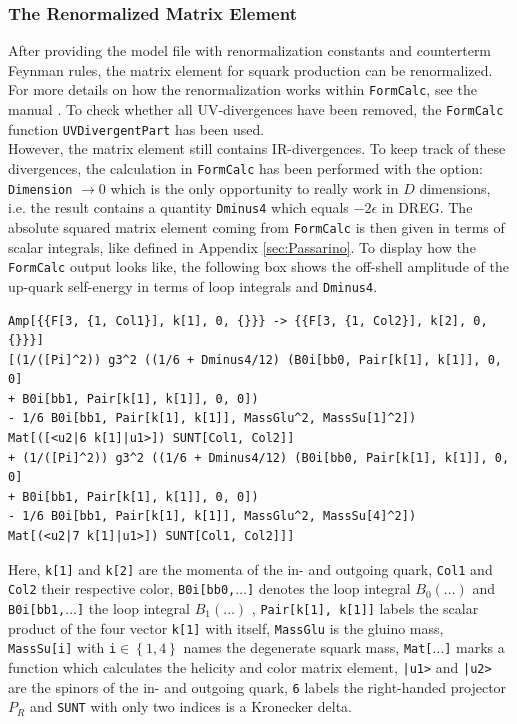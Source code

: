 \subsubsection{The Renormalized Matrix Element}
After providing the model file with renormalization constants and counterterm Feynman rules, the matrix element for squark production can be renormalized. For more details on how the renormalization works within \texttt{FormCalc}, see the manual \cite{FormCalcManual}.
To check whether all UV-divergences have been removed, the \texttt{FormCalc} function \texttt{UVDivergentPart} has been used.\\
However, the matrix element still contains IR-divergences. To keep track of these divergences, the calculation in \texttt{FormCalc} has been performed with the option: \texttt{Dimension} $\to 0$ which is the only opportunity to really work in $D$ dimensions, i.e. the result contains a quantity \texttt{Dminus4} which equals $-2\epsilon$ in DREG. The absolute squared matrix element coming from \texttt{FormCalc} is then given in terms of scalar integrals, like defined in Appendix \ref{sec:Passarino}. To display how the \texttt{FormCalc} output looks like, the following box shows the off-shell amplitude of the up-quark self-energy in terms of loop integrals and \texttt{Dminus4}.
\begin{lstlisting}[style=MyMathematicaOutput]
Amp[{{F[3, {1, Col1}], k[1], 0, {}}} -> {{F[3, {1, Col2}], k[2], 0, {}}}]
[(1/([Pi]^2)) g3^2 ((1/6 + Dminus4/12) (B0i[bb0, Pair[k[1], k[1]], 0, 0] 
+ B0i[bb1, Pair[k[1], k[1]], 0, 0]) 
- 1/6 B0i[bb1, Pair[k[1], k[1]], MassGlu^2, MassSu[1]^2]) 
Mat[([<u2|6 k[1]|u1>]) SUNT[Col1, Col2]] 
+ (1/([Pi]^2)) g3^2 ((1/6 + Dminus4/12) (B0i[bb0, Pair[k[1], k[1]], 0, 0] 
+ B0i[bb1, Pair[k[1], k[1]], 0, 0]) 
- 1/6 B0i[bb1, Pair[k[1], k[1]], MassGlu^2, MassSu[4]^2]) 
Mat[(<u2|7 k[1]|u1>]) SUNT[Col1, Col2]]]
\end{lstlisting}
Here, \texttt{k[1]} and \texttt{k[2]} are the momenta of the in- and outgoing quark, \texttt{Col1} and \texttt{Col2} their respective color, \texttt{B0i[bb0,$\hdots$]} denotes the loop integral $B_0(\hdots)$ and \texttt{B0i[bb1,$\hdots$]} the loop integral $B_1(\hdots)$ , \texttt{Pair[k[1], k[1]]} labels the scalar product of the four vector \texttt{k[1]} with itself, \texttt{MassGlu} is the gluino mass, \texttt{MassSu[i]} with \texttt{i}$\in \left\{ 1,4 \right\}$ names the degenerate squark mass, \texttt{Mat[$\hdots$]} marks a function which calculates the helicity and color matrix element, \texttt{|u1>} and \texttt{|u2>} are the spinors of the in- and outgoing quark, \texttt{6} labels the right-handed projector $P_R$ and \texttt{SUNT} with only two indices is a Kronecker delta.\\
